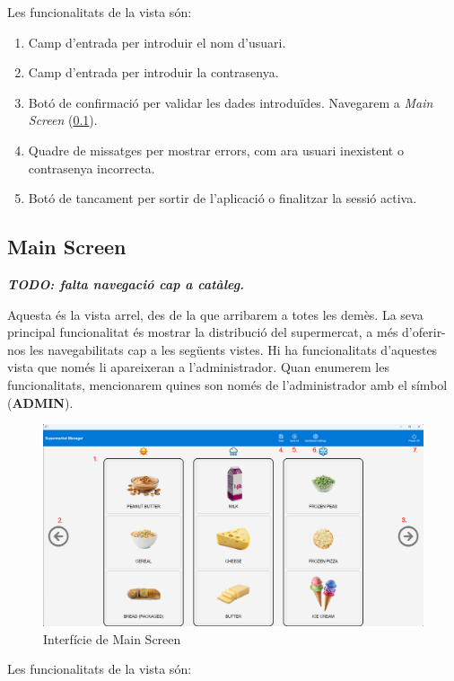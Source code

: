 \documentclass[a4paper,12pt]{article}
\begin{document}
	\noindent Les funcionalitats de la vista són:
	
	\begin{enumerate}[itemsep=0pt, topsep=0pt]
		\item Camp d'entrada per introduir el nom d'usuari.
		\item Camp d'entrada per introduir la contrasenya.
		\item Botó de confirmació per validar les dades introduïdes. Navegarem a \textit{Main Screen} (\ref{sec:mainScreen}).
		\item Quadre de missatges per mostrar errors, com ara usuari inexistent o contrasenya incorrecta.
		\item Botó de tancament per sortir de l'aplicació o finalitzar la sessió activa.
	\end{enumerate}
	
	\newpage
	\subsection{Main Screen}
	\label{sec:mainScreen}
	
	\textbf{\textit{TODO: falta navegació cap a catàleg.}}
	
	Aquesta és la vista arrel, des de la que arribarem a totes les demès. La seva principal funcionalitat és mostrar la distribució del supermercat, a més d'oferir-nos les navegabilitats cap a les següents vistes. Hi ha funcionalitats d'aquestes vista que només li apareixeran a l'administrador. Quan enumerem les funcionalitats, mencionarem quines son només de l'administrador amb el símbol (\textbf{ADMIN}).
	
	\begin{figure}[H] 
		\centering
		\includegraphics[width=0.75\linewidth]{assets/mainscreen.png}
		\caption{Interfície de Main Screen}
	\end{figure}
	
	\noindent Les funcionalitats de la vista són:
	
\end{document}
